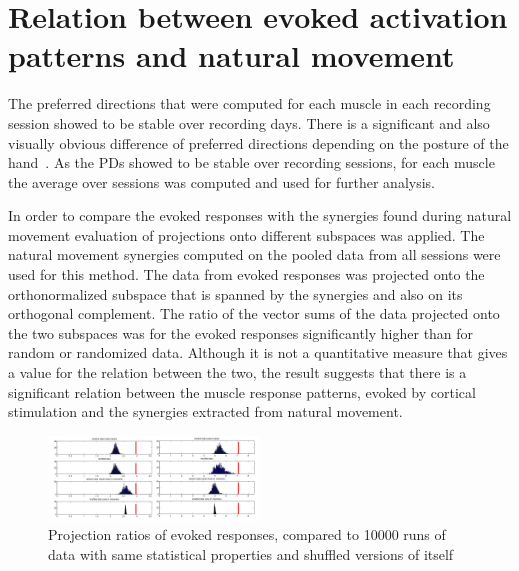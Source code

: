 \clearpage





\section{Relation between evoked activation patterns and natural movement} %
\label{sg:sec:synergy_relations}

The preferred directions that were computed for each muscle in each recording session showed to be stable over recording days. There is a significant and also visually obvious difference of preferred directions depending on the posture of the hand~. As the PDs showed to be stable over recording sessions, for each muscle the average over sessions was computed and used for further analysis.



In order to compare the evoked responses with the synergies found during natural movement evaluation of projections onto different subspaces was applied. The natural movement synergies computed on the pooled data from all sessions were used for this method. The data from evoked responses was projected onto the orthonormalized subspace that is spanned by the synergies and also on its orthogonal complement. The ratio of the vector sums of the data projected onto the two subspaces was for the evoked responses significantly higher than for random or randomized data. Although it is not a quantitative measure that gives a value for the relation between the two, the result suggests that there is a significant relation between the muscle response patterns, evoked by cortical stimulation and the synergies extracted from natural movement. 
\begin{figure}[ht]
	\centering
		\includegraphics[width=0.5\textwidth]{images/projections.jpg}
	\caption{Projection ratios of evoked responses, compared to 10000 runs of data with same statistical properties and shuffled versions of itself}
	\label{sg:fig:images_projection}
\end{figure}








